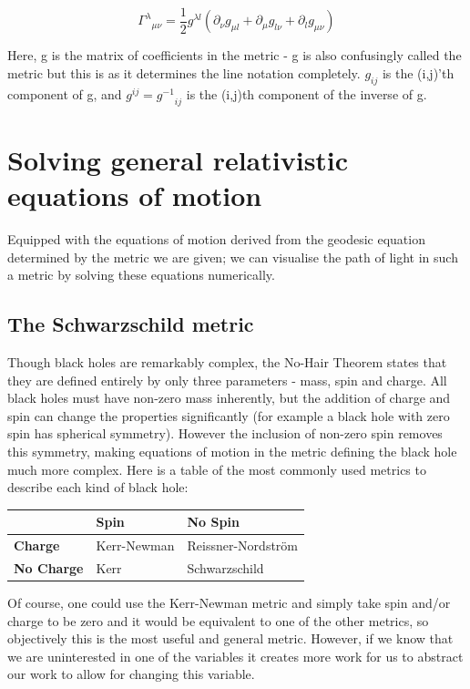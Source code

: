 \documentclass[oneside,openright,frontopenright, singlespacing]{dmathesis}
\begin{document}
	\[{\Gamma^\lambda}_{\mu\nu} = \frac{1}{2}g^{\lambda{l}}(\partial_{\nu}g_{\mu{l}} + \partial_{\mu}g_{l\nu} + \partial_{l}g_{\mu\nu})\]
	
\vspace{1em}
	Here, g is the matrix of coefficients in the metric - g is also confusingly called the metric but this is as it determines the line notation completely. $g_{ij}$ is the (i,j)'th component of g, and $g^{ij} = {g^{-1}}_{ij}$ is the (i,j)th component of the inverse of g.

\chapter{Solving general relativistic equations of motion}

	Equipped with the equations of motion derived from the geodesic equation determined by the metric we are given; we can visualise the path of light in such a metric by solving these equations numerically.


\section{The Schwarzschild metric}

	Though black holes are remarkably complex, the No-Hair Theorem states that they are defined entirely by only three parameters - mass, spin and charge. All black holes must have non-zero mass inherently, but the addition of charge and spin can change the properties significantly (for example a black hole with zero spin has spherical symmetry). However the inclusion of non-zero spin removes this symmetry, making equations of motion in the metric defining the black hole much more complex. Here is a table of the most commonly used metrics to describe each kind of black hole:

\vspace{1em}
\begin{center}
\begin{tabular}{l l l}
\toprule
\textbf{ } & \textbf{Spin} & \textbf{No Spin}\\
\midrule
\textbf{Charge} & Kerr-Newman & Reissner-Nordström \\
\midrule
\textbf{No Charge} & Kerr & Schwarzschild \\
\bottomrule
\end{tabular}
\end{center}

\vspace{1em}
Of course, one could use the Kerr-Newman metric and simply take spin and/or charge to be zero and it would be equivalent to one of the other metrics, so objectively this is the most useful and general metric. However, if we know that we are uninterested in one of the variables it creates more work for us to abstract our work to allow for changing this variable.
\end{document}
